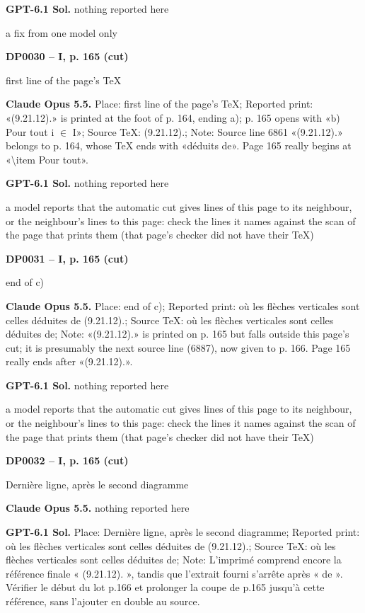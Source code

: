 \textbf{GPT-6.1 Sol.} nothing reported here\par
a fix from one model only\par
\par\noindent\hypertarget{DP0030}{}\textbf{DP0030 -- I, p. 165 (cut)}\par
first line of the page's TeX\par
\textbf{Claude Opus 5.5.} Place: first line of the page's TeX; Reported print: «(9.21.12).» is printed at the foot of p. 164, ending a); p. 165 opens with «b) Pour tout i \ensuremath{\in} I»; Source TeX: (9.21.12).; Note: Source line 6861 «(9.21.12).» belongs to p. 164, whose TeX ends with «déduits de». Page 165 really begins at «\textbackslash{}item Pour tout».\par
\textbf{GPT-6.1 Sol.} nothing reported here\par
a model reports that the automatic cut gives lines of this page to its neighbour, or the neighbour's lines to this page: check the lines it names against the scan of the page that prints them (that page's checker did not have their TeX)\par
\par\noindent\hypertarget{DP0031}{}\textbf{DP0031 -- I, p. 165 (cut)}\par
end of c)\par
\textbf{Claude Opus 5.5.} Place: end of c); Reported print: où les flèches verticales sont celles déduites de (9.21.12).; Source TeX: où les flèches verticales sont celles déduites de; Note: «(9.21.12).» is printed on p. 165 but falls outside this page's cut; it is presumably the next source line (6887), now given to p. 166. Page 165 really ends after «(9.21.12).».\par
\textbf{GPT-6.1 Sol.} nothing reported here\par
a model reports that the automatic cut gives lines of this page to its neighbour, or the neighbour's lines to this page: check the lines it names against the scan of the page that prints them (that page's checker did not have their TeX)\par
\par\noindent\hypertarget{DP0032}{}\textbf{DP0032 -- I, p. 165 (cut)}\par
Dernière ligne, après le second diagramme\par
\textbf{Claude Opus 5.5.} nothing reported here\par
\textbf{GPT-6.1 Sol.} Place: Dernière ligne, après le second diagramme; Reported print: où les flèches verticales sont celles déduites de (9.21.12).; Source TeX: où les flèches verticales sont celles déduites de; Note: L'imprimé comprend encore la référence finale « (9.21.12). », tandis que l'extrait fourni s'arrête après « de ». Vérifier le début du lot p.166 et prolonger la coupe de p.165 jusqu'à cette référence, sans l'ajouter en double au source.\par
